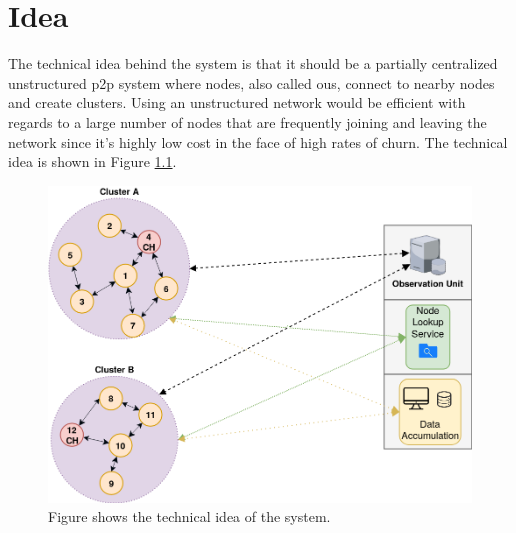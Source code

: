 \documentclass[USenglish]{uit-thesis}
\begin{document}
\chapter{Idea} \label{chap:idea}
\glsresetall





The technical idea behind the system is that it should be a partially centralized unstructured \gls{p2p} system where nodes, also called \glspl{ou}, connect to nearby nodes and create clusters. Using an unstructured network would be efficient with regards to a large number of nodes that are frequently joining and leaving the network since it's highly low cost in the face of high rates of churn. The technical idea is shown in Figure \ref{fig:idea}. 

\begin{figure}
\centering
\includegraphics[width=\textwidth]{idea.png}
\caption{Figure shows the technical idea of the system.}
\label{fig:idea}
\end{figure}
\end{document}
